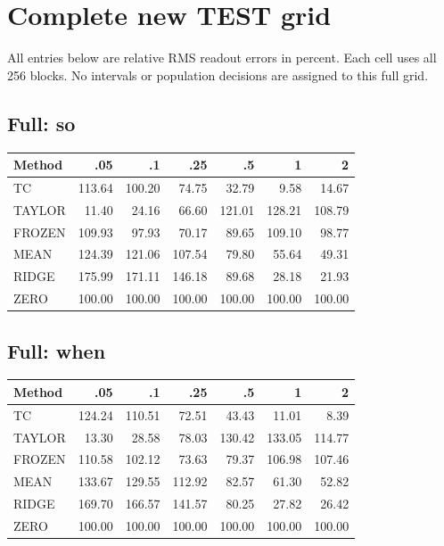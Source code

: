 \section{Complete new TEST grid}\label{app:fullgrid}
All entries below are relative RMS readout errors in percent. Each cell uses all 256 blocks. No intervals or population decisions are assigned to this full grid.
\subsection{Full: so}
\begin{center}\small\begin{tabular}{lrrrrrr}
\toprule Method & .05 & .1 & .25 & .5 & 1 & 2\\
\midrule
TC & 113.64 & 100.20 & 74.75 & 32.79 & 9.58 & 14.67\\
TAYLOR & 11.40 & 24.16 & 66.60 & 121.01 & 128.21 & 108.79\\
FROZEN & 109.93 & 97.93 & 70.17 & 89.65 & 109.10 & 98.77\\
MEAN & 124.39 & 121.06 & 107.54 & 79.80 & 55.64 & 49.31\\
RIDGE & 175.99 & 171.11 & 146.18 & 89.68 & 28.18 & 21.93\\
ZERO & 100.00 & 100.00 & 100.00 & 100.00 & 100.00 & 100.00\\
\bottomrule\end{tabular}\end{center}
\subsection{Full: when}
\begin{center}\small\begin{tabular}{lrrrrrr}
\toprule Method & .05 & .1 & .25 & .5 & 1 & 2\\
\midrule
TC & 124.24 & 110.51 & 72.51 & 43.43 & 11.01 & 8.39\\
TAYLOR & 13.30 & 28.58 & 78.03 & 130.42 & 133.05 & 114.77\\
FROZEN & 110.58 & 102.12 & 73.63 & 79.37 & 106.98 & 107.46\\
MEAN & 133.67 & 129.55 & 112.92 & 82.57 & 61.30 & 52.82\\
RIDGE & 169.70 & 166.57 & 141.57 & 80.25 & 27.82 & 26.42\\
ZERO & 100.00 & 100.00 & 100.00 & 100.00 & 100.00 & 100.00\\
\bottomrule\end{tabular}\end{center}
